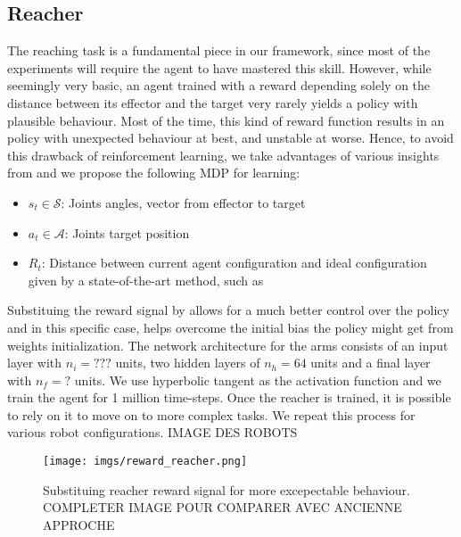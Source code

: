 \documentclass[letterpaper, 10 pt, conference]{ieeeconf}  %
\begin{document}

\subsection{Reacher} %
\label{sub:reacher}


The reaching task is a fundamental piece in our framework, since most of the experiments will require the agent to have mastered this skill. However, while seemingly very basic, an agent trained with a reward depending solely on the distance between its effector and the target very rarely yields a policy with plausible behaviour. Most of the time, this kind of reward function results in an policy with unexpected behaviour at best, and unstable at worse. Hence, to avoid this drawback of reinforcement learning, we take advantages of various insights from \cite{PPOAcrobatics} and we propose the following MDP for learning: 
\begin{itemize}
    \item $s_t \in \mathcal{S}$: Joints angles, vector from effector to target 
    \item $a_t \in \mathcal{A}$: Joints target position
    \item $R_t$: Distance between current agent configuration and ideal configuration given by a state-of-the-art method, such as \cite{BioIK}
  \end{itemize}  

Substituing the reward signal by allows for a much better control over the policy and in this specific case, helps overcome the initial bias the policy might get from weights initialization. The network architecture for the arms consists of an input layer with $n_i = ???$ units, two hidden layers of $n_h = 64$ units and a final layer with $n_f = ?$ units. We use hyperbolic tangent as the activation function and we train the agent for 1 million time-steps. Once the reacher is trained, it is possible to rely on it to move on to more complex tasks. We repeat this process for various robot configurations. \uppercase{Image des robots} %

\begin{figure}
\centering
\texttt{[image: imgs/reward\_reacher.png]}
\caption{Substituing reacher reward signal for more excepectable behaviour. COMPLETER IMAGE POUR COMPARER AVEC ANCIENNE APPROCHE}
\label{transfer0}
\end{figure}
\end{document}
